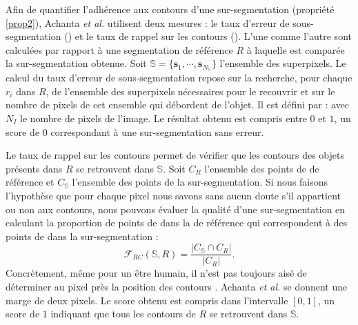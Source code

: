 Afin de quantifier l'adhérence aux contours d'une sur-segmentation (propriété \ref{prop2}), Achanta \textit{et al.} utilisent deux mesures  : le taux d'erreur de sous-segmentation () et le taux de rappel sur les contours ().  L'une comme l'autre sont calculées par rapport à une segmentation de référence $R$ à laquelle est comparée la sur-segmentation obtenue. Soit $\mathbb{S}=\lbrace \mathbf{s}_{1},\cdots, \mathbf{s}_{N_{\mathbb{S}}} \rbrace$ l'ensemble des superpixels. Le calcul du taux d'erreur de sous-segmentation repose sur la recherche, pour chaque  $r_{i}$  dans $R$, de l'ensemble des superpixels nécessaires pour le recouvrir et sur le nombre de pixels de cet ensemble  qui débordent de l'objet. Il est défini par : 
avec $N_{I}$ le nombre de pixels de l'image.  Le résultat obtenu est compris entre $0$ et $1$, un score de $0$ correspondant à une sur-segmentation sans erreur. 

Le taux de rappel sur les contours permet de vérifier que les contours des objets présents dans $R$ se retrouvent dans $\mathbb{S}$.  Soit $C_{R}$ l'ensemble des points de  de référence et $C_{\mathbb{S}}$ l'ensemble des points de  la sur-segmentation. Si nous faisons l'hypothèse que\modif{,} pour chaque pixel\modif{,} nous savons sans aucun doute s'il appartient ou non aux contours, nous pouvons évaluer la qualité d'une sur-segmentation en calculant la proportion de points de  dans la  de référence qui correspondent à des points de  dans la sur-segmentation  : 
\begin{equation}
\label{eq:superpixels:br}
\mathcal{F}_{RC}(\mathbb{S},R) =   \frac { | C_{\mathbb{S}}  \cap C_{R} | }{ | C_{R} |}\text{.}
\end{equation} 
Concrètement, même pour un être humain, il n'est pas toujours aisé de déterminer au pixel près la position des contours . Achanta \textit{et al.} se donnent une marge de deux pixels. Le score obtenu est compris dans l’intervalle $[0,1]$, un score de $1$ indiquant que tous les contours de $R$ se retrouvent dans $\mathbb{S}$. 

